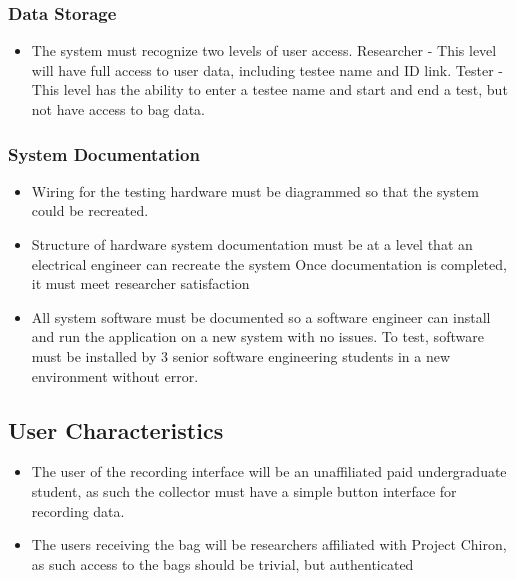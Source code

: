 \documentclass[onecolumn, draftclsnofoot,10pt, compsoc]{IEEEtran}
\begin{document}
\subsubsection{Data Storage}
\begin{itemize}
	\item The system must recognize two levels of user access.
	\subitem Researcher - This level will have full access to user data, including testee name and ID link.
	\subitem Tester - This level has the ability to enter a testee name and start and end a test, but not have access to bag data.
\end{itemize}
\subsubsection{System Documentation}
\begin{itemize}

	\item Wiring for the testing hardware must be diagrammed so that the system could be recreated. 
	\item Structure of hardware system documentation must be at a level that an electrical engineer can recreate the system
		\subitem Once documentation is completed, it must meet researcher satisfaction
	\item All system software must be documented so a software engineer can install and run the application on a new system with no issues. 
		\subitem To test, software must be installed by 3 senior software engineering students in a new environment without error. 
\end{itemize}
\subsection{User Characteristics}
\begin{itemize}
	\item The user of the recording interface will be an unaffiliated paid undergraduate student, as such the collector must have a simple button interface for recording data.
	\item The users receiving the bag will be researchers affiliated with Project Chiron, as such access to the bags should be trivial, but authenticated

\end{itemize}
\end{document}
